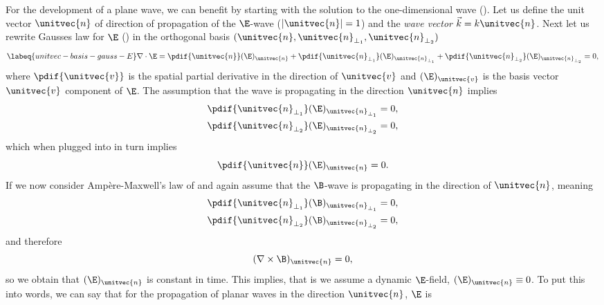 For the development of a plane wave, we can benefit by starting with the solution to the one-dimensional wave 
    ().
Let us define the unit vector \(\unitvec{n}\) of direction of propagation of the \(\E\)-wave (\(|\unitvec{n}| = 1\)) and
    the \emph{wave vector} \(\vec{k} = k \unitvec{n}\).
Next let us rewrite Gausses law for \(\E\) () in the orthogonal basis 
    \((\unitvec{n}, \unitvec{n}_{\perp_1}, \unitvec{n}_{\perp_2})\)
    \begin{equation}
        \labeq{unitvec-basis-gauss-E}
        \nabla \cdot \E = \pdif{\unitvec{n}}(\E)_{\unitvec{n}} + \pdif{\unitvec{n}_{\perp_1}}(\E)_{\unitvec{n}_{\perp_1}}
        + \pdif{\unitvec{n}_{\perp_2}}(\E)_{\unitvec{n}_{\perp_2}} = 0,
    \end{equation}
    where \(\pdif{\unitvec{v}}\) is the spatial partial derivative in the direction of \(\unitvec{v}\) and 
    \((\E)_{\unitvec{v}}\) is the basis vector \(\unitvec{v}\) component of \(\E\).
The assumption that the wave is propagating in the direction \(\unitvec{n}\) implies
    \begin{gather*}
        \pdif{\unitvec{n}_{\perp_1}}(\E)_{\unitvec{n}_{\perp_1}} = 0, \\
        \pdif{\unitvec{n}_{\perp_2}}(\E)_{\unitvec{n}_{\perp_2}} = 0,
    \end{gather*}
    which when plugged into  in turn implies
    \begin{equation*}
        \pdif{\unitvec{n}}(\E)_{\unitvec{n}} = 0.
    \end{equation*}
If we now consider Ampère-Maxwell's law of  and again assume that the \(\B\)-wave is
    propagating in the direction of \(\unitvec{n}\), meaning
    \begin{gather*}
        \pdif{\unitvec{n}_{\perp_1}}(\B)_{\unitvec{n}_{\perp_1}} = 0, \\
        \pdif{\unitvec{n}_{\perp_2}}(\B)_{\unitvec{n}_{\perp_2}} = 0,
    \end{gather*}
    and therefore
    \begin{equation*}
        (\nabla \times \B)_{\unitvec{n}} = 0,
    \end{equation*}
    so we obtain that \((\E)_{\unitvec{n}}\) is constant in time.
This implies, that is we assume a dynamic \(\E\)-field, \((\E)_{\unitvec{n}} \equiv 0\).
To put this into words, we can say that for the propagation of planar waves in the direction \(\unitvec{n}\), \(\E\) is
